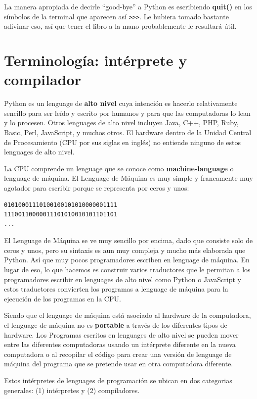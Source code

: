 La manera apropiada de decirle ``good-bye'' a Python es escribiendo  
{\bf quit()} en los s\'imbolos de la terminal que aparecen as\'i {\tt >>>}.
Le hubiera tomado bastante adivinar eso, as\'i que tener el libro a la mano probablemente le resultar\'a \'util.

\section{Terminolog\'ia: int\'erprete y compilador}

Python es un lenguage de {\bf alto nivel} cuya intenci\'on es hacerlo relativamente sencillo para ser le\'ido y escrito por humanos y para que las computadoras 
lo lean y lo procesen. Otros lenguages de alto nivel incluyen Java, C++,
PHP, Ruby, Basic, Perl, JavaScript, y muchos otros. El hardware dentro de la Unidad
Central de Procesamiento (CPU por sus siglas en ingl\'es) no entiende ninguno de estos lenguages de alto nivel.

La CPU comprende un lenguage que se conoce como {\bf machine-language} o lenguage de m\'aquina. El Lenguage de M\'aquina es muy simple y francamente muy agotador para escribir porque se representa por ceros y unos:

\beforeverb
\begin{verbatim}
01010001110100100101010000001111
11100110000011101010010101101101
...
\end{verbatim}
\afterverb
%
El Lenguage de M\'aquina se ve muy sencillo por encima, dado que consiste solo de ceros y unos, pero su sintaxis es aun muy compleja y mucho m\'as elaborada que Python. As\'i que muy pocos programadores escriben en lenguage de m\'aquina. En lugar de eso, lo que hacemos es construir varios traductores que le permitan a los programadores escribir en lenguages de alto nivel como Python o JavaScript
y estos traductores convierten los programas a lenguage de m\'aquina para la ejecuci\'on de los programas en la CPU.

Siendo que el lenguage de m\'aquina est\'a asociado al hardware de la computadora, el lenguage de m\'aquina no es {\bf portable} a trav\'es de los diferentes tipos de hardware. Los Programas escritos en lenguages de 
alto nivel se pueden mover entre las diferentes computadoras usando un int\'erprete diferente en la nueva computadora o al recopilar el c\'odigo para crear una versi\'on de lenguage de m\'aquina del programa que se pretende usar en otra computadora diferente.

Estos int\'erpretes de lenguages de programaci\'on se ubican en dos categorias generales:
(1) int\'erpretes y (2) compiladores.

